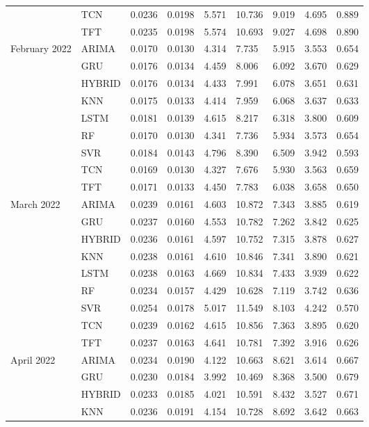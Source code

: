 \begin{tabular}{lllllllll}
 & TCN & 0.0236 & 0.0198 & 5.571 & 10.736 & 9.019 & 4.695 & 0.889 \\
 & TFT & 0.0235 & 0.0198 & 5.574 & 10.693 & 9.027 & 4.698 & 0.890 \\
February 2022 & ARIMA & 0.0170 & 0.0130 & 4.314 & 7.735 & 5.915 & 3.553 & 0.654 \\
 & GRU & 0.0176 & 0.0134 & 4.459 & 8.006 & 6.092 & 3.670 & 0.629 \\
 & HYBRID & 0.0176 & 0.0134 & 4.433 & 7.991 & 6.078 & 3.651 & 0.631 \\
 & KNN & 0.0175 & 0.0133 & 4.414 & 7.959 & 6.068 & 3.637 & 0.633 \\
 & LSTM & 0.0181 & 0.0139 & 4.615 & 8.217 & 6.318 & 3.800 & 0.609 \\
 & RF & 0.0170 & 0.0130 & 4.341 & 7.736 & 5.934 & 3.573 & 0.654 \\
 & SVR & 0.0184 & 0.0143 & 4.796 & 8.390 & 6.509 & 3.942 & 0.593 \\
 & TCN & 0.0169 & 0.0130 & 4.327 & 7.676 & 5.930 & 3.563 & 0.659 \\
 & TFT & 0.0171 & 0.0133 & 4.450 & 7.783 & 6.038 & 3.658 & 0.650 \\
March 2022 & ARIMA & 0.0239 & 0.0161 & 4.603 & 10.872 & 7.343 & 3.885 & 0.619 \\
 & GRU & 0.0237 & 0.0160 & 4.553 & 10.782 & 7.262 & 3.842 & 0.625 \\
 & HYBRID & 0.0236 & 0.0161 & 4.597 & 10.752 & 7.315 & 3.878 & 0.627 \\
 & KNN & 0.0238 & 0.0161 & 4.610 & 10.846 & 7.341 & 3.890 & 0.621 \\
 & LSTM & 0.0238 & 0.0163 & 4.669 & 10.834 & 7.433 & 3.939 & 0.622 \\
 & RF & 0.0234 & 0.0157 & 4.429 & 10.628 & 7.119 & 3.742 & 0.636 \\
 & SVR & 0.0254 & 0.0178 & 5.017 & 11.549 & 8.103 & 4.242 & 0.570 \\
 & TCN & 0.0239 & 0.0162 & 4.615 & 10.856 & 7.363 & 3.895 & 0.620 \\
 & TFT & 0.0237 & 0.0163 & 4.641 & 10.781 & 7.392 & 3.916 & 0.626 \\
April 2022 & ARIMA & 0.0234 & 0.0190 & 4.122 & 10.663 & 8.621 & 3.614 & 0.667 \\
 & GRU & 0.0230 & 0.0184 & 3.992 & 10.469 & 8.368 & 3.500 & 0.679 \\
 & HYBRID & 0.0233 & 0.0185 & 4.021 & 10.591 & 8.432 & 3.527 & 0.671 \\
 & KNN & 0.0236 & 0.0191 & 4.154 & 10.728 & 8.692 & 3.642 & 0.663 \\

\end{tabular}
